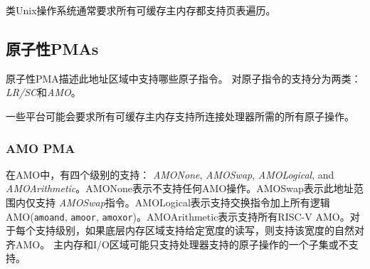 {\iffalse
\begin{commentary}
Unix-like operating systems generally require that all of cacheable main
memory supports page-table walks.
\end{commentary}
\fi
\begin{commentary}
类Unix操作系统通常要求所有可缓存主内存都支持页表遍历。
\end{commentary}

\subsection{原子性PMAs}

\iffalse
Atomicity PMAs describes which atomic instructions are supported in
this address region.
Support for atomic instructions is divided into two
categories: {\em LR/SC} and {\em AMOs}.
\fi
原子性PMA描述此地址区域中支持哪些原子指令。
对原子指令的支持分为两类：{\em LR/SC}和{\em AMO}。

\iffalse
\begin{commentary}
Some platforms might mandate that all of cacheable main memory support
all atomic operations required by the attached processors.
\end{commentary}
\fi
\begin{commentary}
一些平台可能会要求所有可缓存主内存支持所连接处理器所需的所有原子操作。
\end{commentary}

\subsubsection{AMO PMA}

\iffalse
  Within AMOs, there are four levels of
support: {\em AMONone}, {\em AMOSwap}, {\em AMOLogical}, and {\em
  AMOArithmetic}.  AMONone indicates that no AMO operations are
supported.  AMOSwap indicates that only {\tt amoswap} instructions are
supported in this address range.  AMOLogical indicates that swap
instructions plus all the logical AMOs ({\tt amoand}, {\tt amoor},
{\tt amoxor}) are supported.  AMOArithmetic indicates that all RISC-V
AMOs are supported.  For each level of support, naturally aligned AMOs
of a given width are supported if the underlying memory region
supports reads and writes of that width.
Main memory and I/O regions may only support a subset or none of the
processor-supported atomic operations.
\fi
在AMO中，有四个级别的支持： {\em AMONone}, {\em AMOSwap}, {\em AMOLogical}, and {\em
AMOArithmetic}。AMONone表示不支持任何AMO操作。AMOSwap表示此地址范围内仅支持 {\em AMOSwap}指令。AMOLogical表示支持交换指令加上所有逻辑AMO({\tt amoand}, {\tt amoor},
{\tt amoxor})。AMOArithmetic表示支持所有RISC-V AMO。对于每个支持级别，如果底层内存区域支持给定宽度的读写，则支持该宽度的自然对齐AMO。
主内存和I/O区域可能只支持处理器支持的原子操作的一个子集或不支持。

}
